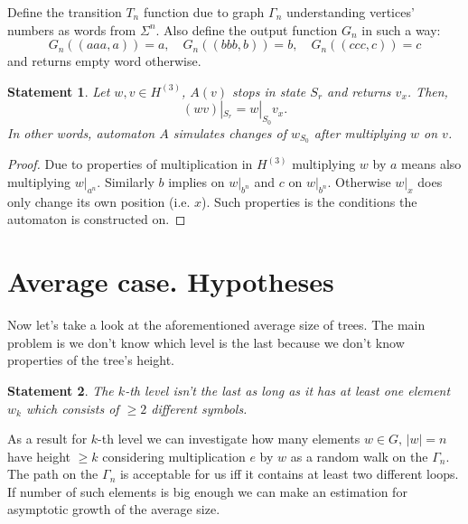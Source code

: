 \documentclass[a4paper,12pt]{amsart}
\newtheorem{statement}{Statement}
\begin{document}
Define the transition $T_n$ function due to graph $\Gamma_n$ understanding vertices' numbers as words from $\Sigma^n$.
Also define the output function $G_n$ in such a way:
$$G_n \left( (aaa, a) \right) = a,\quad G_n \left( (bbb, b) \right) = b, \quad G_n \left( (ccc, c) \right) = c$$
and returns empty word otherwise.

\begin{statement}
	Let $w, v \in H^{(3)}$, $A(v)$ stops in state $S_r$ and returns $v_x$. Then,
	$$ (w v)|_{S_r} = w|_{S_0} v_x.$$
	In other words, automaton $A$ simulates changes of $w_{S_0}$ after multiplying $w$ on $v$.
\end{statement}

\begin{proof}
	Due to properties of multiplication in $H^{(3)}$ multiplying $w$ by $a$ means also multiplying $w|_{a^n}$. Similarly
	$b$ implies on $w|_{b^n}$ and $c$ on $w|_{b^n}$. Otherwise $w|_x$ does only change its own position (i.e. $x$). Such
	properties is the conditions the automaton is constructed on.
\end{proof}

\section{Average case. Hypotheses}

Now let's take a look at the aforementioned average size of trees. The main problem is we don't know which level
is the last because we don't know properties of the tree's height.

\begin{statement}
	The $k$-th level isn't the last as long as it has at least one element $w_k$ which consists of $\ge 2$ different
	symbols.
\end{statement}

As a result for $k$-th level we can investigate how many elements $w \in G, \, |w| = n$ have height $\ge k$ considering
multiplication $e$ by $w$ as a random walk on the $\Gamma_n$. The path on the $\Gamma_n$ is acceptable for us iff it
contains at least two different loops. If number of such elements is big enough we can make an estimation for
asymptotic growth of the average size.


\newpage
\end{document}
